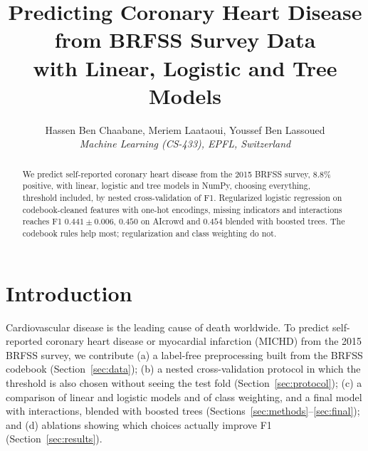 \documentclass[10pt,conference,compsocconf]{IEEEtran}
\begin{document}
\title{Predicting Coronary Heart Disease from BRFSS Survey Data\\with Linear, Logistic and Tree Models}

\author{
  Hassen Ben Chaabane, Meriem Laataoui, Youssef Ben Lassoued\\
  \textit{Machine Learning (CS-433), EPFL, Switzerland}
}

\maketitle

\begin{abstract}
We predict self-reported coronary heart disease from the 2015 BRFSS survey,
8.8\% positive, with linear, logistic and tree models in NumPy, choosing
everything, threshold included, by nested cross-validation of F1.
Regularized logistic regression on codebook-cleaned features with one-hot
encodings, missing indicators and interactions reaches F1
$0.441\pm0.006$, $0.450$ on AIcrowd and $0.454$ blended with boosted trees.
The codebook rules help most; regularization and class weighting do not.
\end{abstract}

\section{Introduction}
Cardiovascular disease is the leading cause of death worldwide. To predict
self-reported coronary heart disease or myocardial infarction (MICHD) from the
2015 BRFSS survey, we contribute (a) a label-free preprocessing built from
the BRFSS codebook (Section~\ref{sec:data}); (b) a
nested cross-validation protocol in which the threshold is also chosen without
seeing the test fold (Section~\ref{sec:protocol}); (c) a comparison of linear
and logistic models and of class weighting, and a final model with
interactions, blended with boosted trees
(Sections~\ref{sec:methods}--\ref{sec:final}); and (d) ablations
showing which choices actually improve F1 (Section~\ref{sec:results}).

\end{document}
